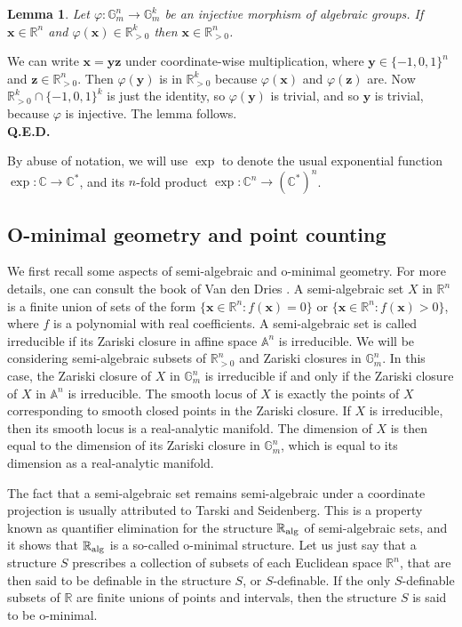 \documentclass[9pt]{amsart}
\theoremstyle{my_theorem_style}
\numberwithin{definition}{section}
\newtheorem{lemma}[definition]{Lemma}
\renewenvironment{proof}{\noindent {\textbf{Proof.}}}{\\\textbf{Q.E.D.}}
\newcommand{\C}{\mathbb{C}}
\newcommand{\G}{\mathbb{G}}
\renewcommand{\phi}{\varphi}
\newcommand{\R}{\mathbb{R}}
\renewcommand{\vec}[1]{\bm{#1}}
\begin{document}
\begin{lemma}
\label{preimage_of_orthant_under_monomial_map}
    Let $\phi : \G_m^n \to \G_m^k$ be an injective morphism of algebraic groups. If $\vec{x} \in \R^n$ and $\phi(\vec{x}) \in \R_{>0}^k$ then $\vec{x} \in \R_{>0}^n$.
\end{lemma}
\begin{proof}
    We can write $\vec{x} = \vec{y} \vec{z}$ under coordinate-wise multiplication, where $\vec{y} \in \{-1, 0, 1\}^n$ and $\vec{z} \in \R_{>0}^n$. Then $\phi(\vec{y})$ is in $\R_{>0}^k$ because $\phi(\vec{x})$ and $\phi(\vec{z})$ are. Now $\R_{>0}^k \cap \{-1, 0, 1\}^k$ is just the identity, so $\phi(\vec{y})$ is trivial, and so $\vec{y}$ is trivial, because $\phi$ is injective. The lemma follows.
\end{proof}

By abuse of notation, we will use $\exp$ to denote the usual exponential function $\exp : \C \to \C^\ast$, and its $n$-fold product $\exp : \C^n \to (\C^\ast)^n$.

\subsection{O-minimal geometry and point counting}

We first recall some aspects of semi-algebraic and o-minimal geometry. For more details, one can consult the book of Van den Dries \cite{Van_den_Dries_tame_topology_and_o-minimal_structures}. A semi-algebraic set $X$ in $\R^n$ is a finite union of sets of the form $\{\vec{x} \in \R^n : f(\vec{x}) = 0\}$ or $\{\vec{x} \in \R^n : f(\vec{x}) > 0\}$, where $f$ is a polynomial with real coefficients. A semi-algebraic set is called irreducible if its Zariski closure in affine space $\mathbb{A}^n$ is irreducible. We will be considering semi-algebraic subsets of $\R_{>0}^n$ and Zariski closures in $\G_m^n$. In this case, the Zariski closure of $X$ in $\G_m^n$ is irreducible if and only if the Zariski closure of $X$ in $\mathbb{A}^n$ is irreducible. The smooth locus of $X$ is exactly the points of $X$ corresponding to smooth closed points in the Zariski closure. If $X$ is irreducible, then its smooth locus is a real-analytic manifold. The dimension of $X$ is then equal to the dimension of its Zariski closure in $\G_m^n$, which is equal to its dimension as a real-analytic manifold. 

The fact that a semi-algebraic set remains semi-algebraic under a coordinate projection is usually attributed to Tarski \cite{Tarski_a_decision_method_for_elementary_algebra_and_geometry} and Seidenberg. This is a property known as quantifier elimination for the structure $\R_{\rm alg}$ of semi-algebraic sets, and it shows that $\R_{\rm alg}$ is a so-called o-minimal structure. Let us just say that a structure $S$ prescribes a collection of subsets of each Euclidean space $\R^n$, that are then said to be definable in the structure $S$, or $S$-definable. If the only $S$-definable subsets of $\R$ are finite unions of points and intervals, then the structure $S$ is said to be o-minimal.
\end{document}
